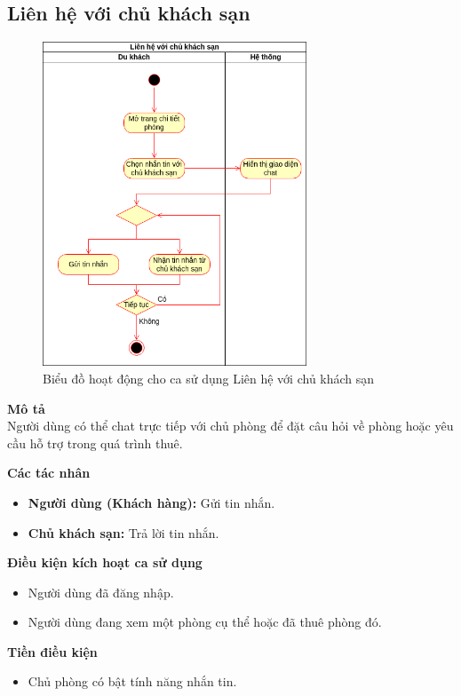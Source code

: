 \subsection{Liên hệ với chủ khách sạn}
\begin{figure}[H]
    \centering
    \includegraphics[width=0.7\textwidth]{img/1.Tuyền-Chat với chủ phòng.drawio.png}
    \caption{Biểu đồ hoạt động cho ca sử dụng Liên hệ với chủ khách sạn}
\end{figure}
\textbf{\indent Mô tả}\\
\indent Người dùng có thể chat trực tiếp với chủ phòng để đặt câu hỏi về phòng hoặc yêu cầu hỗ trợ trong quá trình thuê.

\textbf{Các tác nhân}
\begin{itemize}
    \item \textbf{Người dùng (Khách hàng):} Gửi tin nhắn.
    \item \textbf{Chủ khách sạn:} Trả lời tin nhắn.
\end{itemize}

\textbf{Điều kiện kích hoạt ca sử dụng}
\begin{itemize}
    \item Người dùng đã đăng nhập.
    \item Người dùng đang xem một phòng cụ thể hoặc đã thuê phòng đó.
\end{itemize}

\textbf{Tiền điều kiện}
\begin{itemize}
    \item Chủ phòng có bật tính năng nhắn tin.
\end{itemize}

